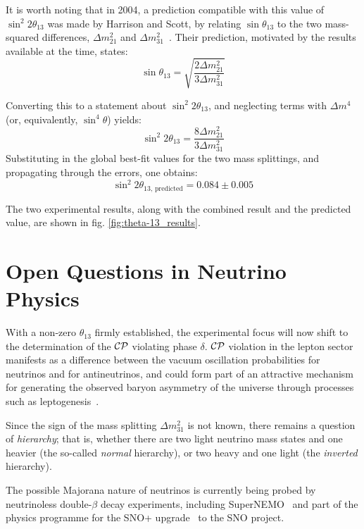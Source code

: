 It is worth noting that in 2004, a prediction compatible with this value of $\sin^2 2\theta_{13}$ was made by Harrison and Scott, by relating $\sin\theta_{13}$ to the two mass-squared differences, $\Delta m^2_{21}$ and $\Delta m^2_{31}$~\citep{Harrison2004}. Their prediction, motivated by the results available at the time, states:
\begin{equation}\label{eqn:theta_13_prediction}
\sin \theta_{13} = \sqrt{\frac{2\Delta m^2_{21}}{3\Delta m^2_{31}}}
\end{equation}

Converting this to a statement about $\sin^2 2\theta_{13}$, and neglecting terms with $\Delta m^4$ (or, equivalently, $\sin^4 \theta$) yields:
\begin{equation}\label{eqn:sin2_2theta_13_prediction}
\sin^2 2\theta_{13} = \frac{8 \Delta m^2_{21}}{3 \Delta m^2_{31}}
\end{equation}
Substituting in the global best-fit values for the two mass splittings, and propagating through the errors, one obtains:
\begin{equation}\label{eqn:prediction_sin2_2theta_13}
\sin^2 2\theta_{13,\,\mathrm{predicted}} = 0.084 \pm 0.005
\end{equation}

The two experimental results, along with the combined result and the predicted value, are shown in fig. \ref{fig:theta-13_results}.

\section{Open Questions in Neutrino Physics}
With a non-zero $\theta_{13}$ firmly established, the experimental focus will now shift to the determination of the $\mathcal{C}\mathcal{P}$ violating phase $\delta$. $\mathcal{C}\mathcal{P}$ violation in the lepton sector manifests as a difference between the vacuum oscillation probabilities for neutrinos and for antineutrinos, and could form part of an attractive mechanism for generating the observed baryon asymmetry of the universe through processes such as leptogenesis~\citep{Riotto1999}.

Since the sign of the mass splitting $\Delta m^2_{31}$ is not known, there remains a question of \emph{hierarchy}; that is, whether there are two light neutrino mass states and one heavier (the so-called \emph{normal} hierarchy), or two heavy and one light (the \emph{inverted} hierarchy). 

The possible Majorana nature of neutrinos is currently being probed by neutrinoless double-$\beta$ decay experiments, including SuperNEMO~\citep{SuperNEMO} and part of the physics programme for the SNO+ upgrade~\citep{SNO+} to the SNO project.
